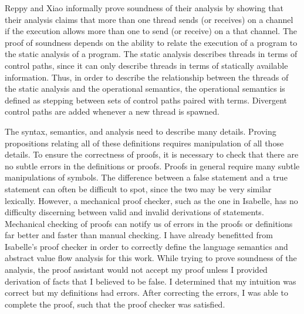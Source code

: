 Reppy and Xiao informally prove soundness of their analysis by showing that their analysis
claims that more than one thread sends (or receives) on a channel if the execution allows more
than one to send (or receive) on a that channel.  The proof of soundness depends on the
ability to relate the execution of a program to the static analysis of a program.  The static
analysis describes threads in terms of control paths, since it can only describe threads in
terms of statically available information. Thus, in order to describe the relationship between
the threads of the static analysis and the operational semantics, the operational semantics is
defined as stepping between sets of control paths paired with terms.  Divergent control paths
are added whenever a new thread is spawned.

The syntax, semantics, and analysis need to describe many details.  Proving propositions
relating all of these definitions requires manipulation of all those details.  To ensure the
correctness of proofs, it is necessary to check that there are no subtle errors in the
definitions or proofs.  Proofs in general require many subtle manipulations of symbols.  The
difference between a false statement and a true statement can often be difficult to spot, since
the two may be very similar lexically.  However, a mechanical proof checker, such as the one in
Isabelle, has no difficulty discerning between valid and invalid derivations of statements.
Mechanical checking of proofs can notify us of errors in the proofs or definitions far better
and faster than manual checking.  I have already benefitted from Isabelle's proof checker in
order to correctly define the language semantics and abstract value flow analysis for this
work.  While trying to prove soundness of the analysis, the proof assistant would not accept my
proof unless I provided derivation of facts that I believed to be false.  I determined that my
intuition was correct but my definitions had errors.  After correcting the errors, I was able
to complete the proof, such that the proof checker was satisfied.

